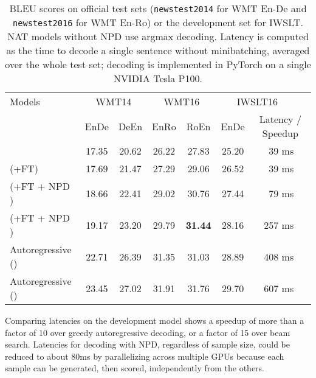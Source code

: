 \documentclass{article} \usepackage{iclr2018_conference,times}
\begin{document}
\begin{table}[t]
\small
\centering
    \begin{tabular}{l|cccc|crr}
    \toprule
    Models                  & \multicolumn{2}{c}{WMT14} & \multicolumn{2}{c|}{WMT16} & \multicolumn{2}{c}{IWSLT16} \\
    \multicolumn{1}{c}{}   & \multicolumn{1}{|c}{EnDe} & \multicolumn{1}{c}{DeEn} & \multicolumn{1}{c}{EnRo} & \multicolumn{1}{c|}{RoEn} & \multicolumn{1}{c}{EnDe} & \multicolumn{2}{c}{Latency / Speedup}  \\
    \midrule


     
         \model{}                       & 17.35 & 20.62& 26.22 & 27.83&  25.20 & 39 ms &  \\
         
         \model{} (+FT)                 & 17.69& 21.47 & 27.29 & 29.06&  26.52 & 39 ms & \\
         
         
         \model{} (+FT + NPD )     & 18.66 & 22.41& 29.02&  30.76 & 27.44 & 79 ms & \\
         
         \model{} (+FT + NPD )    & 19.17 & 23.20 & 29.79&  \textbf{31.44}     & 28.16 & 257 ms &  \\
         \midrule
         Autoregressive ()         & 22.71 & 26.39 & 31.35 & 31.03 & 28.89 & 408 ms &  \\
    	 Autoregressive ()         & 23.45 & 27.02 & 31.91 & 31.76 & 29.70 & 607 ms &  \\
    		
    
    \bottomrule
    \end{tabular}
     \caption{BLEU scores on official test sets (\texttt{newstest2014} for WMT En-De and \texttt{newstest2016} for WMT En-Ro) or the development set for IWSLT. NAT models without NPD use argmax decoding. Latency is computed as the time to decode a single sentence without minibatching, averaged over the whole test set; decoding is implemented in PyTorch on a single NVIDIA Tesla P100.}
     \vspace{-10pt}
  \label{tab:bleu}\end{table}

Comparing latencies on the development model shows a speedup of more than a factor of 10 over greedy autoregressive decoding, or a factor of 15 over beam search.  Latencies for decoding with NPD, regardless of sample size, could be reduced to about 80ms by parallelizing across multiple GPUs because each sample can be generated, then scored, independently from the others.
\end{document}
